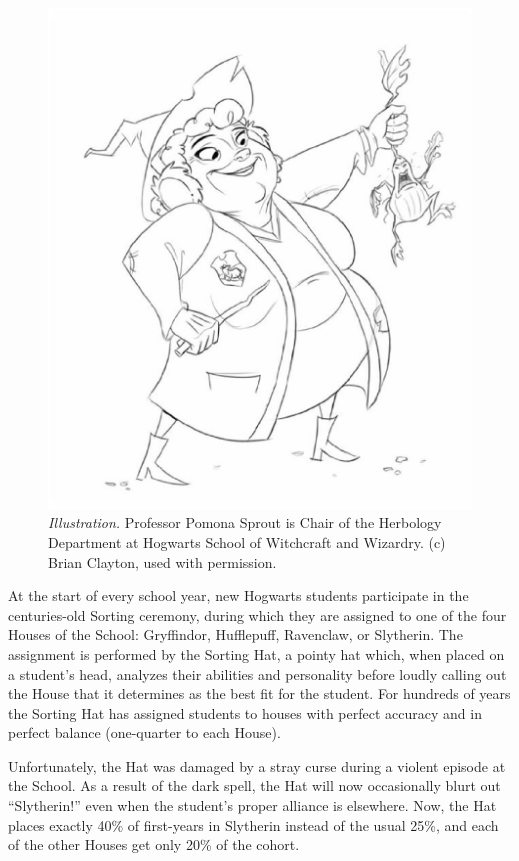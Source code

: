 \begin{figure}[bt]
\centering
\includegraphics[width=.5\textwidth,viewport=64 6 712 782,bb=64 6 712 782]{figs/bi0_etzvandekerckhove_illustration}
\caption*{\textit{Illustration.} Professor Pomona Sprout is Chair of the Herbology Department at Hogwarts School of Witchcraft and Wizardry. (c) Brian Clayton, used with permission.}\label{ill:pomona}
\end{figure}

\label{ex:hat}
At the start of every school year, new Hogwarts students participate in the centuries-old Sorting ceremony, during which they are assigned to one of the four Houses of the School: Gryffindor, Hufflepuff, Ravenclaw, or Slytherin. The assignment is performed by the Sorting Hat, a pointy hat which, when placed on a student's head, analyzes their abilities and personality before loudly calling out the House that it determines as the best fit for the student. For hundreds of years the Sorting Hat has assigned students to houses with perfect accuracy and in perfect balance (one-quarter to each House).

Unfortunately, the Hat was damaged by a stray curse during a violent episode at the School. As a result of the dark spell, the Hat will now occasionally blurt out ``Slytherin!'' even when the student's proper alliance is elsewhere.  {Now, the Hat places exactly 40\% of first-years in Slytherin instead of the usual 25\%, and each of the other Houses get only 20\% of the cohort.}


